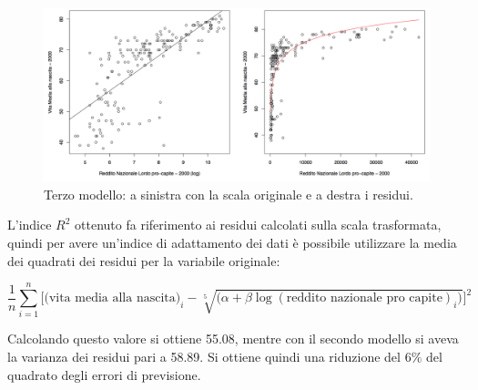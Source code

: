 \begin{figure}[htbp]
	\centering
	\includegraphics[width=.9\textwidth]{./notes/immagini/l7-fig8.png}
	\caption{Terzo modello: a sinistra con la scala originale e a destra i residui.}
\end{figure}

L'indice $ R^2 $ ottenuto fa riferimento ai residui calcolati sulla scala trasformata, quindi per avere un'indice di adattamento dei dati è possibile utilizzare la media dei quadrati dei residui per la variabile originale:

$$
\frac{1}{n}\sum\limits_{i=1}^n \bigg[ \big(\text{vita media alla nascita}\big)_i - \sqrt[5]{\big(\alpha + \beta \log(\text{reddito nazionale pro capite})_i\big)}\bigg]^2
$$

Calcolando questo valore si ottiene 55.08, mentre con il secondo modello si aveva la varianza dei residui pari a 58.89. Si ottiene quindi una riduzione del $ 6\% $ del quadrato degli errori di previsione.









